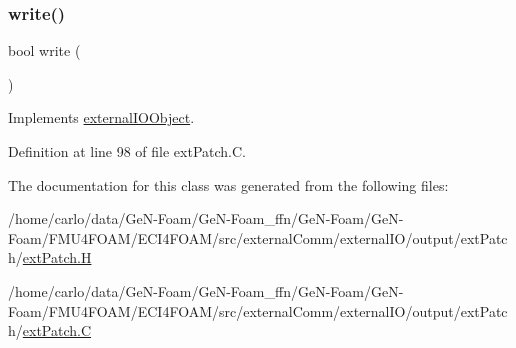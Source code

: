 \subsubsection{\texorpdfstring{write()}{write()}}
{\footnotesize\ttfamily bool write (\begin{DoxyParamCaption}{ }\end{DoxyParamCaption})\hspace{0.3cm}{\ttfamily [virtual]}}



Implements \hyperlink{classFoam_1_1externalIOObject_1_1externalIOObject_afb09203164c30c34e8eca81ef0211745}{external\+I\+O\+Object}.



Definition at line 98 of file ext\+Patch.\+C.



The documentation for this class was generated from the following files\+:\begin{DoxyCompactItemize}
\item 
/home/carlo/data/\+Ge\+N-\/\+Foam/\+Ge\+N-\/\+Foam\+\_\+ffn/\+Ge\+N-\/\+Foam/\+Ge\+N-\/\+Foam/\+F\+M\+U4\+F\+O\+A\+M/\+E\+C\+I4\+F\+O\+A\+M/src/external\+Comm/external\+I\+O/output/ext\+Patch/\hyperlink{extPatch_8H}{ext\+Patch.\+H}\item 
/home/carlo/data/\+Ge\+N-\/\+Foam/\+Ge\+N-\/\+Foam\+\_\+ffn/\+Ge\+N-\/\+Foam/\+Ge\+N-\/\+Foam/\+F\+M\+U4\+F\+O\+A\+M/\+E\+C\+I4\+F\+O\+A\+M/src/external\+Comm/external\+I\+O/output/ext\+Patch/\hyperlink{extPatch_8C}{ext\+Patch.\+C}\end{DoxyCompactItemize}
